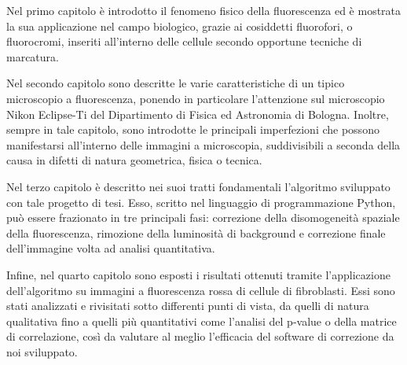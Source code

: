 Nel primo capitolo è introdotto il fenomeno fisico della fluorescenza ed è mostrata la sua applicazione nel campo biologico, grazie ai cosiddetti fluorofori, o fluorocromi, inseriti all'interno delle cellule secondo opportune tecniche di marcatura.

Nel secondo capitolo sono descritte le varie caratteristiche di un tipico microscopio a fluorescenza, ponendo in particolare l'attenzione sul microscopio Nikon Eclipse-Ti del Dipartimento di Fisica ed Astronomia di Bologna. 
Inoltre, sempre in tale capitolo, sono introdotte le principali imperfezioni che possono manifestarsi all'interno delle immagini a microscopia, suddivisibili a seconda della causa in difetti di natura geometrica, fisica o tecnica.

Nel terzo capitolo è descritto nei suoi tratti fondamentali l'algoritmo sviluppato con tale progetto di tesi. 
Esso, scritto nel linguaggio di programmazione Python, può essere frazionato in tre principali fasi: correzione della disomogeneità spaziale della fluorescenza, rimozione della luminosità di background e correzione finale dell'immagine volta ad analisi quantitativa.

Infine, nel quarto capitolo sono esposti i risultati ottenuti tramite l'applicazione dell'algoritmo su immagini a fluorescenza rossa di cellule di fibroblasti.
Essi sono stati analizzati e rivisitati sotto differenti punti di vista, da quelli di natura qualitativa fino a quelli più quantitativi come l'analisi del p-value o della matrice di correlazione, così da valutare al meglio l'efficacia del software di correzione da noi sviluppato.
